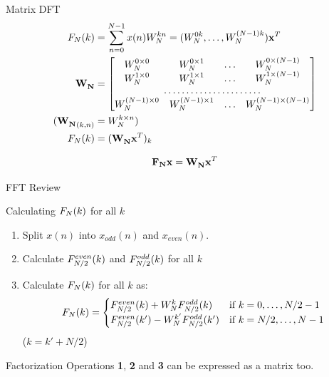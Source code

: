 \begin{myframe}{Matrix DFT}
\centering
\begin{align*}
\fn(k)&=\dft = (\wn{0k},\dots,\wn{(N-1)k}) \xv^T \\
\wvm &= \begin{bmatrix}
    \wn{0\times0}       & \wn{0\times1} & \dots & \wn{0\times(N-1)} \\
    \wn{1\times0}       & \wn{1\times1} &\dots & \wn{1\times(N-1)} \\
    \hdotsfor{4} \\
    \wn{(N-1)\times0}   & \wn{(N-1)\times1} &  \dots & \wn{(N-1)\times(N-1)}
\end{bmatrix}\\
(\wvm_{(k,n)} &=\wn{k \times n})\\
\fn(k) &= (\wvm \xv^T)_k 
\end{align*}
\begin{block}{}
\begin{equation*}
\mathbf{F_N} \mathbf{x} = \mathbf{W_N^{}} \mathbf{x}^T 
\end{equation*}
\end{block}

\end{myframe}

\begin{myframe}{FFT Review}
\centering

\begin{block}{Calculating $F_N(k)$ for all $k$}
\begin{enumerate}
\item Split $x(n)$ into $x_{odd}(n)$ and $x_{even}(n)$.
\item Calculate $F_{N/2}^{even}(k)$ and $F_{N/2}^{odd}(k)$ for all $k$
\item Calculate $F_N(k)$ for all $k$ as:
\begin{equation}
F_N (k) = \begin{cases}
F_{N/2}^{even} (k) + W_N^{k} F_{N/2}^{odd} (k) & \mbox{if } k=0,\dots,N/2-1 \\
F_{N/2}^{even} (k') - W_N^{k'} F_{N/2}^{odd} (k') & \mbox{if } k=N/2,\dots,N-1 
\end{cases}
\end{equation}
($k=k'+N/2$)
\end{enumerate}
\end{block}

\begin{block}{Factorization}
Operations \textbf{1}, \textbf{2} and \textbf{3} can be expressed as a matrix too.
\end{block}

\end{myframe}


